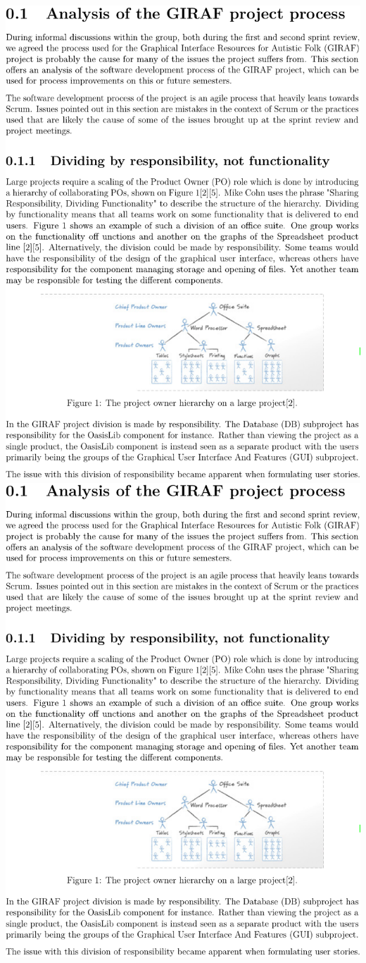 \includegraphics[page=2,width=\textwidth]{part_appendix/sw601f15.pdf}
\includegraphics[page=3,width=\textwidth]{part_appendix/sw601f15.pdf}
